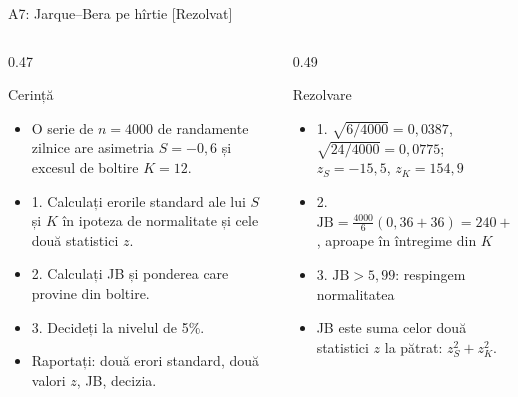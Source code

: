 \begin{frame}{A7: Jarque--Bera pe hîrtie [Rezolvat]}
\itemsize{\footnotesize}
\begin{columns}[T]
\begin{column}{0.47\textwidth}
\begin{block}{Cerință}
\begin{itemize}
    \item O serie de $n = 4000$ de randamente zilnice are asimetria $S = -0{,}6$ și excesul de boltire $K = 12$.
    \item 1. Calculați erorile standard ale lui $S$ și $K$ în ipoteza de normalitate și cele două statistici $z$.
    \item 2. Calculați JB și ponderea care provine din boltire.
    \item 3. Decideți la nivelul de 5\%.
    \item Raportați: două erori standard, două valori $z$, JB, decizia.
\end{itemize}
\end{block}
\end{column}
\begin{column}{0.49\textwidth}
\begin{exampleblock}{Rezolvare}
\begin{itemize}
    \item 1. $\sqrt{6/4000} = 0{,}0387$, $\sqrt{24/4000} = 0{,}0775$; $z_S = -15{,}5$, $z_K = 154{,}9$
    \item 2. $\text{JB} = \frac{4000}{6}(0{,}36 + 36) = 240 + 24\,000 = 24\,240$, aproape în întregime din $K$
    \item 3. $\text{JB} > 5{,}99$: respingem normalitatea
    \item JB este suma celor două statistici $z$ la pătrat: $z_S^2 + z_K^2$.
\end{itemize}
\end{exampleblock}
\end{column}
\end{columns}
\end{frame}

